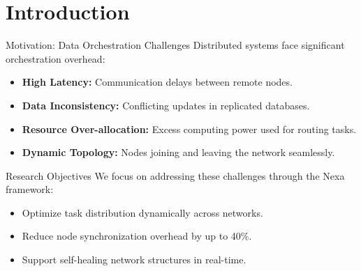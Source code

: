 \section{Introduction}

\begin{frame}{Motivation: Data Orchestration Challenges}
    Distributed systems face significant orchestration overhead:
    \begin{itemize}
        \item<1-> \textbf{High Latency:} Communication delays between remote nodes.
        \item<2-> \textbf{Data Inconsistency:} Conflicting updates in replicated databases.
        \item<3-> \textbf{Resource Over-allocation:} Excess computing power used for routing tasks.
        \item<4-> \textbf{Dynamic Topology:} Nodes joining and leaving the network seamlessly.
    \end{itemize}
\end{frame}

\begin{frame}{Research Objectives}
    We focus on addressing these challenges through the Nexa framework:
    \begin{itemize}
        \item Optimize task distribution dynamically across networks.
        \item Reduce node synchronization overhead by up to 40\%.
        \item Support self-healing network structures in real-time.
    \end{itemize}
\end{frame}
